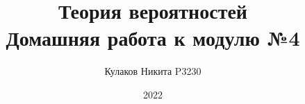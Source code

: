
\title{Теория вероятностей\\ Домашняя работа к модулю №4}
\date{2022}
\author{Кулаков Никита P3230}



\maketitle

\begin{sloppypar}
\tableofcontents
\newpage


\end{sloppypar}


